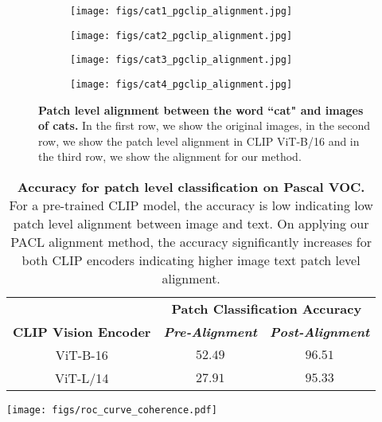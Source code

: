 \documentclass[10pt,twocolumn,letterpaper]{article}
\begin{document}
\begin{figure}[!t]
    \begin{subfigure}{0.25\linewidth}
        \centering
        \texttt{[image: figs/cat1\_pgclip\_alignment.jpg]}
\end{subfigure}
    \begin{subfigure}{0.25\linewidth}
        \centering
        \texttt{[image: figs/cat2\_pgclip\_alignment.jpg]}
\end{subfigure}
    \begin{subfigure}{0.28\linewidth}
        \centering
        \texttt{[image: figs/cat3\_pgclip\_alignment.jpg]}
\end{subfigure}
    \begin{subfigure}{0.14\linewidth}
        \centering
        \texttt{[image: figs/cat4\_pgclip\_alignment.jpg]}
\end{subfigure}
    \vspace{-2mm}
    \caption{\textbf{Patch level alignment between the word ``cat" and images of cats.} In the first row, we show the original images, in the second row, we show the patch level alignment in CLIP ViT-B/16 and in the third row, we show the alignment for our method.}
    \vspace{-4mm}
    \label{fig:alignment_qualitative}
\end{figure}



\begin{table}
    \centering
    \begin{minipage}{0.6\linewidth}
    \centering
    \scriptsize
    \resizebox{\linewidth}{!}
    {
    \begin{tabular}{ccc}
    \toprule
    & \multicolumn{2}{c}{\textbf{Patch Classification Accuracy}} \\
    \textbf{CLIP Vision Encoder} & \textbf{\textit{Pre-Alignment}} & \textbf{\textit{Post-Alignment}} \\
    \midrule
    ViT-B-16 & $52.49$ & $96.51$ \\
    ViT-L/14 & $27.91$ & $95.33$ \\
    \bottomrule
    \end{tabular}
    }
    \caption{\textbf{Accuracy for patch level classification on Pascal VOC.} For a pre-trained CLIP model, the accuracy is low indicating low patch level alignment between image and text. On applying our PACL alignment method, the accuracy significantly increases for both CLIP encoders indicating higher image text patch level alignment.}
    \label{table:alignment_quantitative}
    \end{minipage} \hfill
    \begin{minipage}{0.37\linewidth}
        \centering
        \texttt{[image: figs/roc\_curve\_coherence.pdf]}
        \label{fig:roc_coherence}
    \end{minipage}
\end{table}
\end{document}
